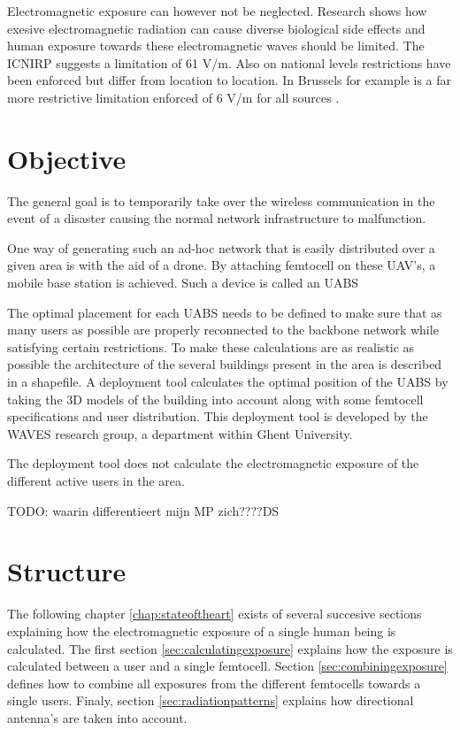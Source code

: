 Electromagnetic exposure can however not be neglected. Research shows how exesive electromagnetic radiation can cause diverse biological side effects \cite{bioeffects} and human exposure towards these electromagnetic waves should be limited. The \gls{ICNIRP} 
suggests a limitation of 61 V/m. Also on national levels restrictions have been enforced but differ from location to location. In Brussels for example is a far more restrictive limitation enforced of 6 V/m for all sources \cite{J1, J5}.
\section{Objective}
\label{sec:objective}
The general goal is to temporarily take over the wireless communication in the event of a disaster causing the normal network infrastructure to malfunction.

One way of generating such an ad-hoc network that is easily distributed over a given area is with the aid of a drone. By attaching femtocell on these UAV's, a mobile base station is achieved. Such a device is called an \gls{UABS}

The optimal placement for each \gls{UABS} needs to be defined to make sure that as many users as possible are properly reconnected to the backbone network while satisfying certain restrictions. To make these calculations are as realistic as possible the architecture of the several buildings present in the area is described in a shapefile. 
A deployment tool calculates the optimal position of the \gls{UABS} by taking the 3D models of the building into account along with some femtocell specifications and user distribution. This deployment tool is developed by the WAVES research group, a department within Ghent University.

The deployment tool does not calculate the electromagnetic exposure of the different active users in the area.

TODO: waarin differentieert mijn MP zich????DS

\section{Structure}
\label{sec:structure}

The following chapter \ref{chap:stateoftheart} exists of several succesive sections explaining how the electromagnetic exposure of a single human being is calculated. The first section \ref{sec:calculatingexposure}
explains how the exposure is calculated between a user and a single femtocell. Section \ref{sec:combiningexposure}  defines how to combine all exposures from the different femtocells towards a single users.
Finaly, section \ref{sec:radiationpatterns} explains how directional antenna's are taken into account.

